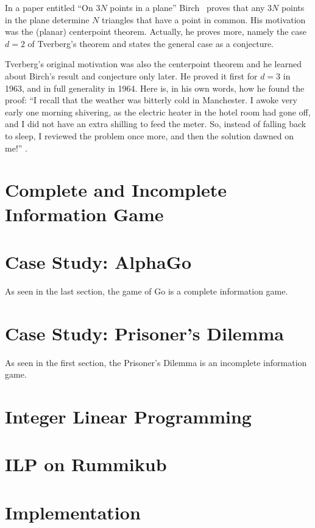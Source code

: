 \documentclass[11pt]{article}
\begin{document}
	In a paper entitled ``On $3N$ points in a plane'' Birch~\cite{Birch:1959} proves that any $3N$ points in the plane determine $N$ triangles that have a point in common. His motivation was the (planar) centerpoint theorem. Actually, he proves more, namely the case $d=2$ of Tverberg's theorem and states the general case as a conjecture.
	
	Tverberg's original motivation was also the centerpoint theorem and he learned about Birch's result and conjecture only later. He proved it first for $d=3$ in 1963, and in full generality in 1964.  Here is, in his own words, how he found the proof:  ``I recall that the weather was bitterly cold in Manchester. I awoke very early one morning shivering, as the electric heater in the hotel room had gone off, and I did not have an extra shilling to feed the meter. So, instead of falling back to sleep, I reviewed the problem once more, and then the solution dawned on me!'' \cite{tve:recollections}.
	
	\section{Complete and Incomplete Information Game}\label{section-information}
	
	\section{Case Study: AlphaGo}\label{section-alphago}
	As seen in the last section, the game of Go is a complete information game.
	\section{Case Study: Prisoner's Dilemma}\label{section-prisoner's dilemma}
	As seen in the first section, the Prisoner's Dilemma is an incomplete information game.
	\section{Integer Linear Programming}\label{section-ILP}
	
	\section{ILP on Rummikub}\label{section-applications}
	

	\section{Implementation}\label{section-spaces}
	
	
	
\end{document}
